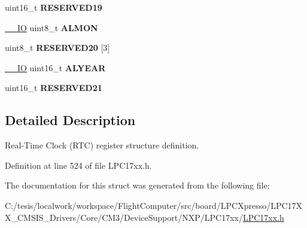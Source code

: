 \begin{DoxyCompactItemize}
\item 
\hypertarget{struct_l_p_c___r_t_c___type_def_a909bf90bf8e36d2c3ebfa93c40869dbe}{uint16\-\_\-t {\bfseries \-R\-E\-S\-E\-R\-V\-E\-D19}}\label{struct_l_p_c___r_t_c___type_def_a909bf90bf8e36d2c3ebfa93c40869dbe}

\item 
\hypertarget{struct_l_p_c___r_t_c___type_def_a5dd7a4940549d293d9bd629ed2b54eb2}{\hyperlink{group___c_m_s_i_s__core__definitions_gaec43007d9998a0a0e01faede4133d6be}{\-\_\-\-\_\-\-I\-O} uint8\-\_\-t {\bfseries \-A\-L\-M\-O\-N}}\label{struct_l_p_c___r_t_c___type_def_a5dd7a4940549d293d9bd629ed2b54eb2}

\item 
\hypertarget{struct_l_p_c___r_t_c___type_def_a42a5b6f556d31a436249c4710dae7eb7}{uint8\-\_\-t {\bfseries \-R\-E\-S\-E\-R\-V\-E\-D20} \mbox{[}3\mbox{]}}\label{struct_l_p_c___r_t_c___type_def_a42a5b6f556d31a436249c4710dae7eb7}

\item 
\hypertarget{struct_l_p_c___r_t_c___type_def_a287e351eb6c21f7f86730ee888013df1}{\hyperlink{group___c_m_s_i_s__core__definitions_gaec43007d9998a0a0e01faede4133d6be}{\-\_\-\-\_\-\-I\-O} uint16\-\_\-t {\bfseries \-A\-L\-Y\-E\-A\-R}}\label{struct_l_p_c___r_t_c___type_def_a287e351eb6c21f7f86730ee888013df1}

\item 
\hypertarget{struct_l_p_c___r_t_c___type_def_a679737cb2219077ea4e97e0d5ccc89d1}{uint16\-\_\-t {\bfseries \-R\-E\-S\-E\-R\-V\-E\-D21}}\label{struct_l_p_c___r_t_c___type_def_a679737cb2219077ea4e97e0d5ccc89d1}

\end{DoxyCompactItemize}


\subsection{\-Detailed \-Description}
\-Real-\/\-Time \-Clock (\-R\-T\-C) register structure definition. 

\-Definition at line 524 of file \-L\-P\-C17xx.\-h.



\-The documentation for this struct was generated from the following file\-:\begin{DoxyCompactItemize}
\item 
\-C\-:/tesis/localwork/workspace/\-Flight\-Computer/src/board/\-L\-P\-C\-Xpresso/\-L\-P\-C17\-X\-X\-\_\-\-C\-M\-S\-I\-S\-\_\-\-Drivers/\-Core/\-C\-M3/\-Device\-Support/\-N\-X\-P/\-L\-P\-C17xx/\hyperlink{_l_p_c17xx_8h}{\-L\-P\-C17xx.\-h}\end{DoxyCompactItemize}
